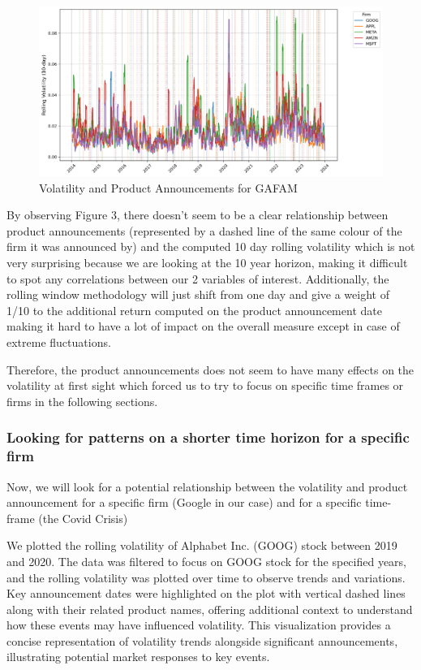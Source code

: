 \documentclass[12pt, oneside]{article}
\begin{document}
\begin{figure}[H]
    \centering
    \includegraphics[width=0.8\linewidth]{../images/GAFAM_pattern.png}
    \caption{Volatility and Product Announcements for GAFAM}
    \label{fig:GAFAM_pattern}
\end{figure}

By observing Figure 3, there doesn't seem to be a clear relationship between product announcements (represented by a dashed line of the same colour of the firm it was announced by) and the computed 10 day rolling volatility which is not very surprising because we are looking at the 10 year horizon, making it difficult to spot any correlations between our 2 variables of interest. Additionally, the rolling window methodology will just shift from one day and give a weight of 1/10 to the additional return computed on the product announcement date making it hard to have a lot of impact on the overall measure except in case of extreme fluctuations.

Therefore, the product announcements does not seem to have many effects on the volatility at first sight which forced us to try to focus on specific time frames or firms in the following sections.

\subsubsection{Looking for patterns on a shorter time horizon for a specific firm}
Now, we will look for a potential relationship between the volatility and product announcement for a specific firm (Google in our case) and for a specific time-frame (the Covid Crisis)

We plotted the rolling volatility of Alphabet Inc. (GOOG) stock between 2019 and 2020. The data was filtered to focus on GOOG stock for the specified years, and the rolling volatility was plotted over time to observe trends and variations. Key announcement dates were highlighted on the plot with vertical dashed lines along with their related product names, offering additional context to understand how these events may have influenced volatility. This visualization provides a concise representation of volatility trends alongside significant announcements, illustrating potential market responses to key events. 
\end{document}
